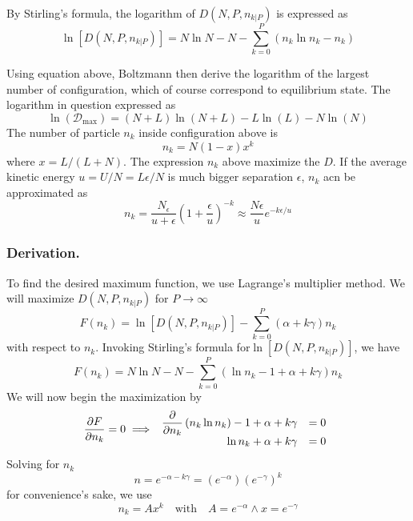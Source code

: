 \documentclass[../../../Main.tex]{subfiles}
\begin{document}
By Stirling’s formula, the logarithm of $D(N , P, n_{k|P} )$ is expressed as
\begin{equation*}
    \ln\left[D(N , P, n_{k|P} )\right]=N\ln N-N-\sum_{k=0}^{P}\left(n_k\ln n_k-n_k\right)
\end{equation*}

Using equation above, Boltzmann then derive the logarithm of the largest number of configuration, which of course correspond to equilibrium state. The logarithm in question expressed as 
\begin{equation*}
    \ln(\mathcal{D}_\text{max})= (N+L)\ln (N+L) - L\ln (L)-N\ln (N)
\end{equation*}
The number of particle $n_k$ inside configuration above is 
\begin{equation*}
    n_k=N(1-x)x^k
\end{equation*}
where $x=L/(L+N)$. The expression $n_k$ above maximize the $D$. If the average kinetic energy $u=U/N=L\epsilon/N$ is much bigger separation $\epsilon$, $n_k$ acn be approximated as 
\begin{equation*}
    n_k=\frac{N_\epsilon}{u+\epsilon}\left(1+\frac{\epsilon}{u}\right)^{-k}\approx\frac{N\epsilon}{u}e^{-k\epsilon/u}
\end{equation*}

\subsubsection*{Derivation.} To find the desired maximum function, we use Lagrange's multiplier method. We will maximize $D(N , P, n_{k|P})$ for $P\rightarrow\infty$
\begin{equation*}
    F(n_k)=\ln\left[D(N , P, n_{k|P} )\right]- \sum_{k=0}^{P}(\alpha + k\gamma )n_k
\end{equation*}
with respect to $n_k$. Invoking Stirling's formula for$\ln\left[D(N , P, n_{k|P} )\right]$, we have
\begin{equation*}
    F(n_k)=N\ln N-N-\sum_{k=0}^{P}(\ln n_k -1 +\alpha + k\gamma )n_k
\end{equation*}
We will now begin the maximization by
\begin{equation*}
    \frac{\partial F}{\partial n_k}=0\implies\begin{array}{r l}
        \dfrac{\partial }{\partial n_k}\left(n_k\ln n_k\right)-1+ \alpha +k\gamma&=0\\
        \ln n_k+\alpha +k\gamma&=0
    \end{array}
\end{equation*}
Solving for $n_k$
\begin{equation*}
    n=e^{-\alpha-k\gamma}=\left(e^{-\alpha}\right)\left(e^{-\gamma}\right)^k
\end{equation*}
for convenience’s sake, we use 
\begin{equation*}
    n_k=Ax^k\quad \text{with}\quad A=e^{-\alpha}\land x=e^{-\gamma}
\end{equation*}
\end{document}
